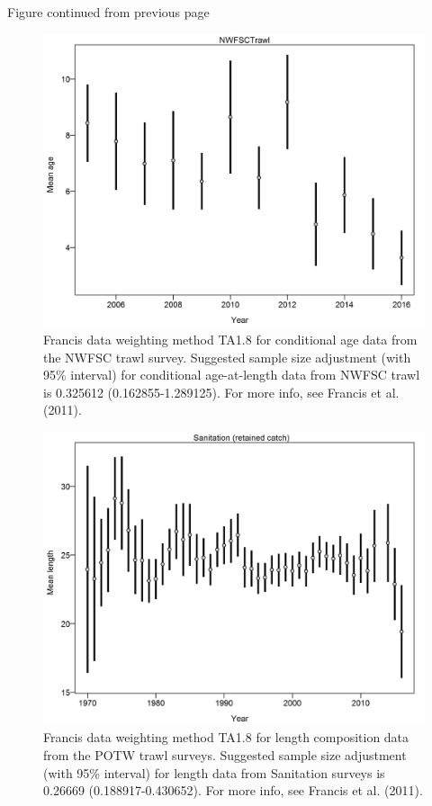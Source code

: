 \documentclass[12pt,]{article}
\begin{document}
\begin{center} 

              Figure continued from previous page 

             \end{center}

\begin{figure}[htbp]
\centering
\includegraphics{r4ss/plots_mod1/comp_condAALdat_data_weighting_TA1.8_condAgeNWFSCTrawl.png}
\caption{Francis data weighting method TA1.8 for conditional age data
from the NWFSC trawl survey. Suggested sample size adjustment (with 95\%
interval) for conditional age-at-length data from NWFSC trawl is
0.325612 (0.162855-1.289125). For more info, see Francis et al. (2011).
\label{fig:comp_condAALdat_data_weighting_TA1.8_condAgeNWFSCTrawl}}
\end{figure}

\begin{figure}[htbp]
\centering
\includegraphics{r4ss/plots_mod1/comp_lendat_data_weighting_TA1.8_Sanitation.png}
\caption{Francis data weighting method TA1.8 for length composition data
from the POTW trawl surveys. Suggested sample size adjustment (with 95\%
interval) for length data from Sanitation surveys is 0.26669
(0.188917-0.430652). For more info, see Francis et al. (2011).
\label{fig:comp_lendat_data_weighting_TA1.8_Sanitation}}
\end{figure}
\end{document}
